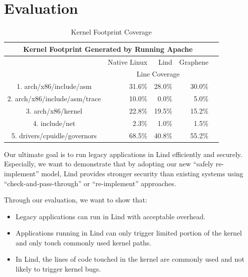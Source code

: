 \section{Evaluation}
\label{sec.evaluation}


\begin{table}[t]
\begin{tabular*}{\textwidth}{c @{\extracolsep{\fill}} rrrr}
\toprule
\multicolumn{4}{c}{Kernel Footprint Generated by Running Apache} \\

\midrule
 & Native Linux    &  Lind & Graphene \\
\cmidrule(r){2-4}
& \multicolumn{3}{c}{Line Coverage} \\
\midrule
1. arch/x86/include/asm                 & 31.6\%          & 28.0\%    & 30.0\%      \\
2. arch/x86/include/asm/trace    &  10.0\%          & 0.0\%       &  5.0\%       \\
3. arch/x86/kernel                            &  22.8\%          & 19.5\%       & 15.2\%       \\
4. include/net                                     &  2.3\%            & 1.0\%       &  1.5\%          \\
5. drivers/cpuidle/governors         &  68.5\%          & 40.8\%       &  55.2\%       \\
\bottomrule
\end{tabular*}
\caption {Kernel Footprint Coverage}
\label{table:kernel_footprint_coverage}
\end{table}


Our ultimate goal is to run legacy applications in Lind efficiently and securely. Especially, we want to demonstrate that by 
adopting our new ``safely re-implement'' model, Lind provides stronger security than existing systems using 
``check-and-pass-through'' or ``re-implement'' approaches. 


Through our evaluation, we want to show that:
\begin{itemize} 
  \item Legacy applications can run in Lind with acceptable overhead.
  \item Applications running in Lind can only trigger limited portion of the kernel and only touch commonly used kernel paths.   
  \item In Lind, the lines of code touched in the kernel are commonly used and not likely to trigger kernel bugs.   
\end{itemize}


